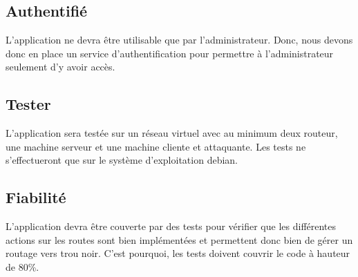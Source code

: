 \subsection{Authentifié}
L’application ne devra être utilisable que par l'administrateur. Donc, nous devons donc en place un service d'authentification pour permettre à l'administrateur seulement d'y avoir accès.

\subsection{Tester}
L'application sera testée sur un réseau virtuel avec au minimum deux routeur, une machine serveur et une machine cliente et attaquante. Les tests ne s'effectueront que sur le système d'exploitation debian.

\subsection{Fiabilité}
L'application devra être couverte par des tests pour vérifier que les différentes actions sur les routes sont bien implémentées et permettent donc bien de gérer un routage vers trou noir. C'est pourquoi, les tests doivent couvrir le code à hauteur de 80\%.




